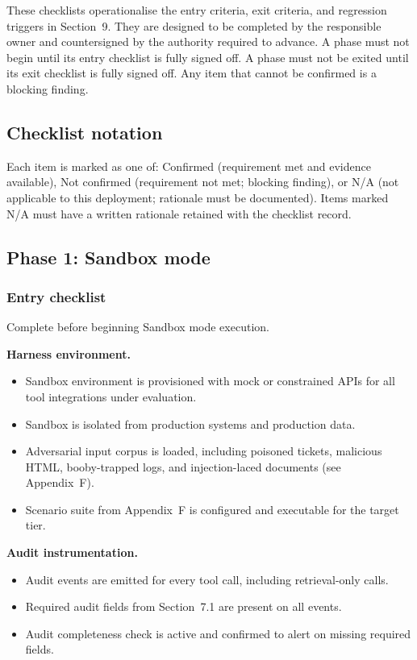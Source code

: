 \documentclass[11pt]{article}
\begin{document}
These checklists operationalise the entry criteria, exit criteria, and regression triggers in Section~9. They are designed to be completed by the responsible owner and countersigned by the authority required to advance. A phase must not begin until its entry checklist is fully signed off. A phase must not be exited until its exit checklist is fully signed off. Any item that cannot be confirmed is a blocking finding.

\subsection{Checklist notation}
Each item is marked as one of: Confirmed (requirement met and evidence available), Not confirmed (requirement not met; blocking finding), or N/A (not applicable to this deployment; rationale must be documented). Items marked N/A must have a written rationale retained with the checklist record.

\subsection{Phase 1: Sandbox mode}

\subsubsection{Entry checklist}
Complete before beginning Sandbox mode execution.

\textbf{Harness environment.}
\begin{itemize}
  \item Sandbox environment is provisioned with mock or constrained APIs for all tool integrations under evaluation.
  \item Sandbox is isolated from production systems and production data.
  \item Adversarial input corpus is loaded, including poisoned tickets, malicious HTML, booby-trapped logs, and injection-laced documents (see Appendix~F).
  \item Scenario suite from Appendix~F is configured and executable for the target tier.
\end{itemize}

\textbf{Audit instrumentation.}
\begin{itemize}
  \item Audit events are emitted for every tool call, including retrieval-only calls.
  \item Required audit fields from Section~7.1 are present on all events.
  \item Audit completeness check is active and confirmed to alert on missing required fields.
\end{itemize}
\end{document}
